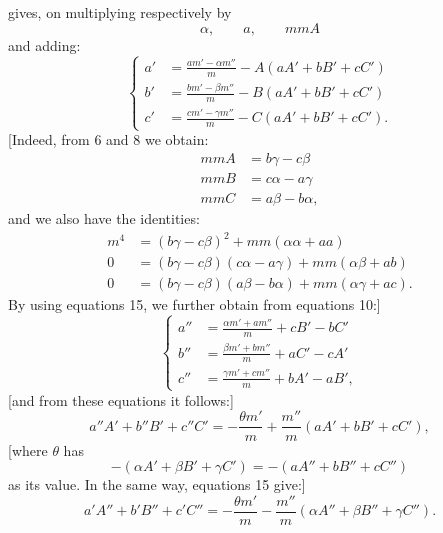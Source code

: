 %
\noindent gives, on multiplying respectively by
\[
\alpha,\qquad a,\qquad mmA
\]
and adding:
\begin{equation}\tag*{[15]}
\left\{\begin{aligned}
a'&=\frac{am'-\alpha m''}{m}-A(aA'+bB'+cC')\\
b'&=\frac{bm'-\beta m''}{m}-B(aA'+bB'+cC')\\
c'&=\frac{cm'-\gamma m''}{m}-C(aA'+bB'+cC').
\end{aligned}\right.
\end{equation}
[Indeed, from 6 and 8 we obtain:
\[
\begin{aligned}
mmA&=b\gamma-c\beta\\
mmB&=c\alpha-a\gamma\\
mmC&=a\beta-b\alpha,
\end{aligned}
\]
and we also have the identities:
\[
\begin{aligned}
m^4&=(b\gamma-c\beta)^2+mm(\alpha\alpha+aa)\\
0&=(b\gamma-c\beta)(c\alpha-a\gamma)+mm(\alpha\beta+ab)\\
0&=(b\gamma-c\beta)(a\beta-b\alpha)+mm(\alpha\gamma+ac).
\end{aligned}
\]
\indent By using equations 15, we further obtain from equations 10:]
\begin{equation}\tag*{[16]}
\left\{\begin{aligned}
a''&=\frac{\alpha m'+am''}{m}+cB'-bC'\\
b''&=\frac{\beta m'+bm''}{m}+aC'-cA'\\
c''&=\frac{\gamma m'+cm''}{m}+bA'-aB',
\end{aligned}\right.
\end{equation}
[and from these equations it follows:]
\begin{equation}\tag*{[17]}
a''A'+b''B'+c''C'=-\frac{\theta m'}{m}+\frac{m''}{m}(aA'+bB'+cC'),
\end{equation}
[where $\theta$ has
\[
-(\alpha A'+\beta B'+\gamma C')=-(aA''+bB''+cC'')
\]
as its value. In the same way, equations 15 give:]
\begin{equation}\tag*{[18]}
a'A''+b'B''+c'C''=-\frac{\theta m'}{m}-\frac{m''}{m}(\alpha A''+\beta B''+\gamma C'').
\end{equation}
